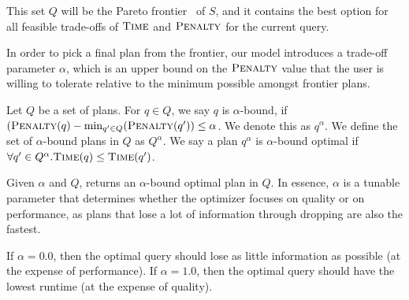 This set $Q$ will be the Pareto frontier~\cite{pareto1964cours} of $S$, and it contains the best option for all feasible trade-offs of $\textsc{Time}$ and $\textsc{Penalty}$ for the current query.

In order to pick a final plan from the frontier, our model introduces a trade-off parameter $\alpha$, which is an upper bound on the $\textsc{Penalty}$ value that the user is willing
to tolerate relative to the minimum possible amongst frontier plans.

\begin{definition}
Let $Q$ be a set of plans. For $q \in Q$, we say $q$ is $\alpha$-bound, if $(\textsc{Penalty}(q) - \min_{q' \in Q}(\textsc{Penalty}(q')) \leq \alpha$. We denote this as $q^\alpha$.
We define the set of $\alpha$-bound plans in $Q$ as $Q^\alpha$.
We say a plan $q^\alpha$ is $\alpha$-bound optimal if $\forall q' \in Q^\alpha. \textsc{Time}(q) \leq \textsc{Time}(q')$. 
\end{definition}

Given $\alpha$ and $Q$, \ProjectName{} returns an $\alpha$-bound optimal plan in $Q$. In essence, $\alpha$ is a tunable parameter 
that determines whether the optimizer focuses on quality or on performance, as plans that
lose a lot of information through dropping are also the fastest. 

If $\alpha=0.0$, then the optimal query should lose as little information as possible (at
the expense of performance). If $\alpha = 1.0$, then the optimal query should have the
lowest runtime (at the expense of quality).

